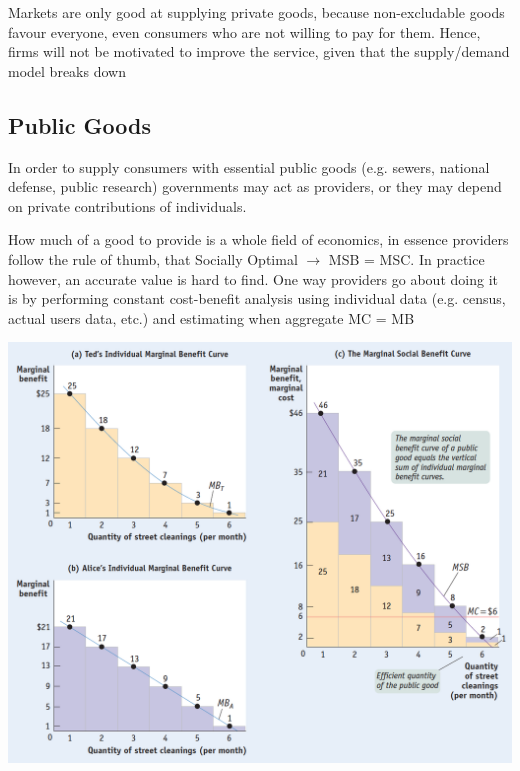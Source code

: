 \documentclass[english,course,draft]{Notes}
\begin{document}
\par{Markets are only good at supplying private goods, because non-excludable goods favour everyone, even consumers who are not willing to pay for them. Hence, firms will not be motivated to improve the service, given that the supply/demand model  breaks down}

 

\subsection{Public Goods}


\par{In order to supply consumers with essential public goods (e.g. sewers, national defense, public research) governments may act as providers, or they may depend on private contributions of individuals.}
\par{How much of a good to provide is a whole field of economics, in essence providers follow the rule of thumb, that Socially Optimal $\rightarrow$ MSB = MSC. In practice however, an accurate value is hard to find. One way providers go about doing it is by performing constant cost-benefit analysis using individual data (e.g. census, actual users data, etc.) and estimating when aggregate MC = MB }

\includegraphics[width=\textwidth]{public}
\end{document}
